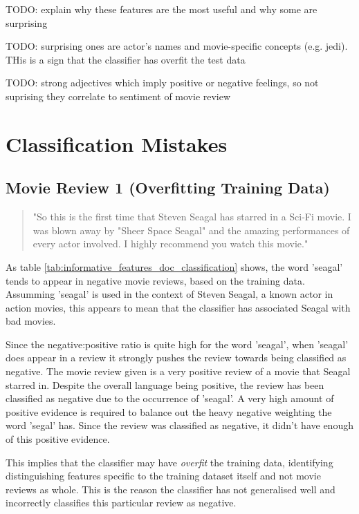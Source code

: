 \documentclass{article}
\begin{document}
TODO: explain why these features are the most useful and why some are surprising

TODO: surprising ones are actor's names and movie-specific concepts (e.g. jedi). THis is a sign that the classifier has overfit the test data

TODO: strong adjectives which imply positive or negative feelings, so not suprising they correlate to sentiment of movie review

\section {Classification Mistakes}

\subsection{Movie Review 1 (Overfitting Training Data)}

\begin{quote}
"So this is the first time that Steven Seagal has starred in a Sci-Fi movie. I was blown away by "Sheer Space Seagal" and the amazing performances of every actor involved. I highly recommend you watch this movie."
\end{quote}

As table \ref{tab:informative_features_doc_classification} shows, the word 'seagal' tends to appear in negative movie reviews, based on the training data. Assumming 'seagal' is used in the context of Steven Seagal, a known actor in action movies, this appears to mean that the classifier has associated Seagal with bad movies.

Since the negative:positive ratio is quite high for the word 'seagal', when 'seagal' does appear in a review it strongly pushes the review towards being classified as negative. The movie review given is a very positive review of a movie that Seagal starred in. Despite the overall language being positive, the review has been classified as negative due to the occurrence of 'seagal'. A very high amount of positive evidence is required to balance out the heavy negative weighting the word 'segal' has. Since the review was classified as negative, it didn't have enough of this positive evidence.

This implies that the classifier may have \textit{overfit} the training data, identifying distinguishing features specific to the training dataset itself and not movie reviews as whole. This is the reason the classifier has not generalised well and incorrectly classifies this particular review as negative.
\end{document}
